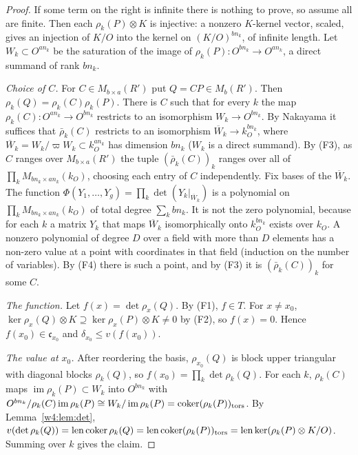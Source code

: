 \begin{proof}
If some term on the right is infinite there is nothing to prove, so assume all are finite. Then each $\rho_k(P)\otimes K$ is injective: a nonzero $K$-kernel vector, scaled, gives an injection of $K/O$ into the kernel on $(K/O)^{bn_k}$, of infinite length. Let $W_k\subset O^{an_k}$ be the saturation of the image of $\rho_k(P)\colon O^{bn_k}\to O^{an_k}$, a direct summand of rank $bn_k$.

\emph{Choice of $C$.} For $C\in M_{b\times a}(R')$ put $Q=CP\in M_b(R')$. Then $\rho_k(Q)=\rho_k(C)\rho_k(P)$. There is $C$ such that for every $k$ the map $\rho_k(C)\colon O^{an_k}\to O^{bn_k}$ restricts to an isomorphism $W_k\to O^{bn_k}$. By Nakayama it suffices that $\bar\rho_k(C)$ restricts to an isomorphism $\overline W_k\to k_O^{bn_k}$, where $\overline W_k=W_k/\varpi W_k\subset k_O^{an_k}$ has dimension $bn_k$ ($W_k$ is a direct summand). By (F3), as $C$ ranges over $M_{b\times a}(R')$ the tuple $(\bar\rho_k(C))_k$ ranges over all of $\prod_kM_{bn_k\times an_k}(k_O)$, choosing each entry of $C$ independently. Fix bases of the $\overline W_k$. The function $\Phi(Y_1,\dots,Y_g)=\prod_k\det(Y_k|_{\overline W_k})$ is a polynomial on $\prod_kM_{bn_k\times an_k}(k_O)$ of total degree $\sum_kbn_k$. It is not the zero polynomial, because for each $k$ a matrix $Y_k$ that maps $\overline W_k$ isomorphically onto $k_O^{bn_k}$ exists over $k_O$. A nonzero polynomial of degree $D$ over a field with more than $D$ elements has a non-zero value at a point with coordinates in that field (induction on the number of variables). By (F4) there is such a point, and by (F3) it is $(\bar\rho_k(C))_k$ for some $C$.

\emph{The function.} Let $f(x)=\det\rho_x(Q)$. By (F1), $f\in T$. For $x\ne x_0$, $\ker\rho_x(Q)\otimes K\supseteq\ker\rho_x(P)\otimes K\ne0$ by (F2), so $f(x)=0$. Hence $f(x_0)\in\mathfrak c_{x_0}$ and $\delta_{x_0}\le v(f(x_0))$.

\emph{The value at $x_0$.} After reordering the basis, $\rho_{x_0}(Q)$ is block upper triangular with diagonal blocks $\rho_k(Q)$, so $f(x_0)=\prod_k\det\rho_k(Q)$. For each $k$, $\rho_k(C)$ maps $\operatorname{im}\rho_k(P)\subset W_k$ into $O^{bn_k}$ with $O^{bn_k}/\rho_k(C)\operatorname{im}\rho_k(P)\cong W_k/\operatorname{im}\rho_k(P)=\operatorname{coker}(\rho_k(P))_{\rm tors}$. By Lemma~\ref{w4:lem:det}, $v(\det\rho_k(Q))=\operatorname{len}\operatorname{coker}\rho_k(Q)=\operatorname{len}\operatorname{coker}(\rho_k(P))_{\rm tors}=\operatorname{len}\ker(\rho_k(P)\otimes K/O)$. Summing over $k$ gives the claim.
\end{proof}

